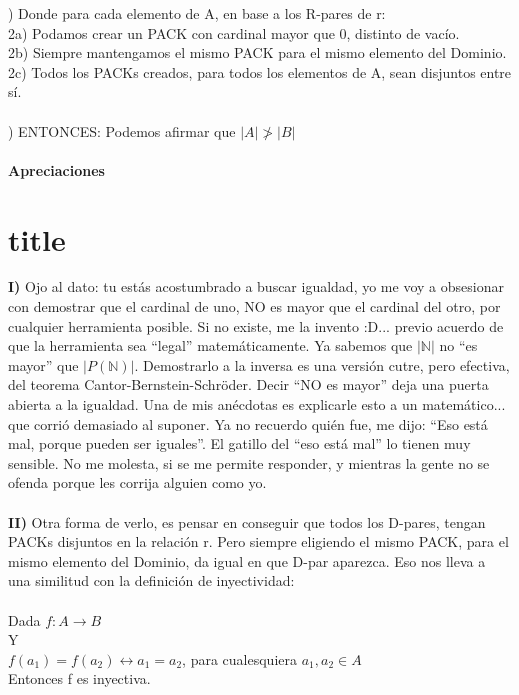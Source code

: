 	) Donde para cada elemento de A, en base a los R-pares de r:\\
	2a) Podamos crear un PACK con cardinal mayor que 0, distinto de vacío.\\
	2b) Siempre mantengamos el mismo PACK para el mismo elemento del Dominio.\\
	2c) Todos los PACKs creados, para todos los elementos de A, sean disjuntos entre sí.
	\\\\
	
	) ENTONCES: Podemos afirmar que $|A| \ngtr |B|$
	
	
	\subsection{Apreciaciones}\part{title}
	
	\noindent
	\textbf{I)} Ojo al dato: tu estás acostumbrado a buscar igualdad, yo me voy a obsesionar con demostrar que el cardinal de uno, NO es mayor que el cardinal del otro, por cualquier herramienta posible. Si no existe, me la invento :D... previo acuerdo de que la herramienta sea ``legal'' matemáticamente. Ya sabemos que $|\mathbb{N}|$ no ``es mayor'' que $|P(\mathbb{N})|$. Demostrarlo a la inversa es una versión cutre, pero efectiva, del teorema Cantor-Bernstein-Schröder. Decir ``NO es mayor'' deja una puerta abierta a la igualdad. Una de mis anécdotas es explicarle esto a un matemático... que corrió demasiado al suponer. Ya no recuerdo quién fue, me dijo: ``Eso está mal, porque pueden ser iguales''. El gatillo del ``eso está mal'' lo tienen muy sensible. No me molesta, si se me permite responder, y mientras la gente no se ofenda porque les corrija alguien como yo.\\\\
	
	\noindent
	\textbf{II)} Otra forma de verlo, es pensar en conseguir que todos los D-pares, tengan PACKs disjuntos en la relación r. Pero siempre eligiendo el mismo PACK, para el mismo elemento del Dominio, da igual en que D-par aparezca. Eso nos lleva a una similitud con la definición de inyectividad:\\\\
	Dada $f: A \rightarrow B$\\
	Y\\
	$f(a_{1}) = f(a_{2}) \leftrightarrow a_{1} = a_{2}$, para cualesquiera $a_{1},a_{2} \in A$\\
	Entonces f es inyectiva.\\\\
	

